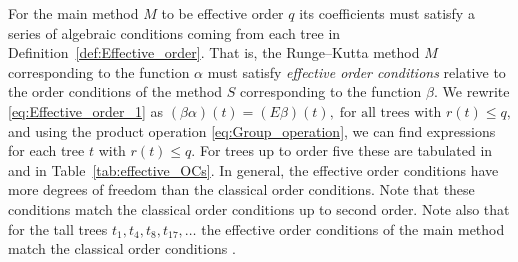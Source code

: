 For the main method $M$ to be effective order $q$ its coefficients must satisfy a series of algebraic conditions coming from each tree in Definition~\ref{def:Effective_order}.
That is, the Runge--Kutta method $M$ corresponding to the function $\alpha$ must satisfy
\emph{effective order conditions} relative to the order conditions of the
method $S$ corresponding to the function $\beta$.
We rewrite \eqref{eq:Effective_order_1} as
$(\beta\alpha)(t) = (E\beta)(t), \; \text{for all trees with $r(t) \leq q$,}$
and using the product operation \eqref{eq:Group_operation}, we can find expressions for each tree $t$ with $r(t) \leq q$.
For trees up to order five these are tabulated in \cite[Table~3.89]{Butcher2008_book}
and in Table~\ref{tab:effective_OCs}.
In general, the effective order conditions have more degrees of
freedom than the classical order conditions.
Note that these conditions match the classical order conditions up to
second order.
Note also that for the tall trees $t_1, t_4, t_8, t_{17}, \dots$ the
effective order conditions of the main method match the classical
order conditions \cite{Butcher2008_book}.
